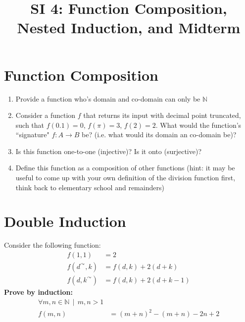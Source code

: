 \documentclass[12pt]{article}
\date{}
\author{}
\title{SI 4: Function Composition, Nested Induction, and Midterm}
\begin{document}
	
	\maketitle
	\section{Function Composition}
	\begin{enumerate}
		\item Provide a function who's domain and co-domain can only be $\mathbb{N}$
		\item Consider a function $f$ that returns its input with decimal point truncated, such that $f(0.1) = 0$, $f(\pi) = 3$, $f(2) =2$. What would the function's ``signature" $f: A \to B$ be? (i.e. what would its domain an co-domain be)?
		\item Is this function one-to-one (injective)? Is it onto (surjective)?
		\item Define this function as a composition of other functions (hint: it may be useful to come up with your own definition of the division function first, think back to elementary school and remainders)
	\end{enumerate}
	\section{Double Induction}
	Consider the following function:
	\begin{align*}
		f(1,1) &= 2\\
		f(d^{\curvearrowright}, k) &= f(d,k) + 2(d+k)\\
		f(d, k^{\curvearrowright}) &= f(d,k) + 2(d + k-1)
	\end{align*}
	\textbf{Prove by induction:}
	\begin{align*}
	\forall{m,n} \in \mathbb{N}\:\:|\:\: m,n>1\\
	f(m,n) &= (m+n)^2 - (m+n) -2n + 2
	\end{align*}
\end{document}
